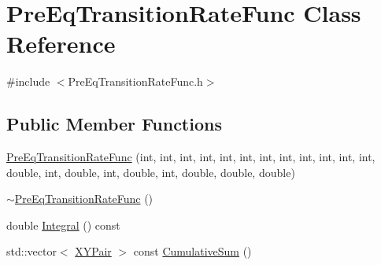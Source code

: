 \hypertarget{classPreEqTransitionRateFunc}{\section{Pre\-Eq\-Transition\-Rate\-Func Class Reference}
\label{classPreEqTransitionRateFunc}
}


{\ttfamily \#include $<$Pre\-Eq\-Transition\-Rate\-Func.\-h$>$}

\subsection*{Public Member Functions}
\begin{DoxyCompactItemize}
\item 
\hyperlink{classPreEqTransitionRateFunc_a41e4aa6f4e9fa23fe5b3cef603de4e62}{Pre\-Eq\-Transition\-Rate\-Func} (int, int, int, int, int, int, int, int, int, int, int, int, double, int, double, int, double, int, double, double, double)
\item 
\hyperlink{classPreEqTransitionRateFunc_a3403caf6c009181e59bc1a942ceb45d4}{$\sim$\-Pre\-Eq\-Transition\-Rate\-Func} ()
\item 
double \hyperlink{classPreEqTransitionRateFunc_aad1a50ccd54be0f68a3f6181c59eb3f2}{Integral} () const 
\item 
std\-::vector$<$ \hyperlink{classXYPair}{X\-Y\-Pair} $>$ const \hyperlink{classPreEqTransitionRateFunc_ab509af190f43f46d28555535bd00737b}{Cumulative\-Sum} ()
\end{DoxyCompactItemize}


